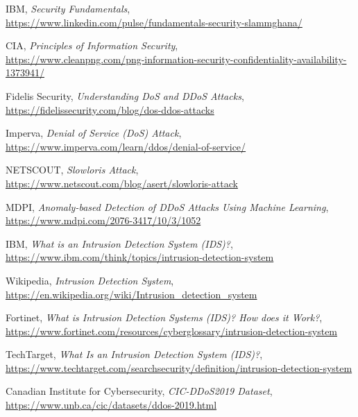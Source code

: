 \documentclass[16pt]{report}
\begin{document}
\begin{thebibliography}{99}

IBM, \emph{Security Fundamentals},\\
\url{https://www.linkedin.com/pulse/fundamentals-security-slammghana/}

CIA, \emph{Principles of Information Security},\\
\url{https://www.cleanpng.com/png-information-security-confidentiality-availability-1373941/}

Fidelis Security, \emph{Understanding DoS and DDoS Attacks},\\
\url{https://fidelissecurity.com/blog/dos-ddos-attacks}

Imperva, \emph{Denial of Service (DoS) Attack},\\
\url{https://www.imperva.com/learn/ddos/denial-of-service/}

NETSCOUT, \emph{Slowloris Attack},\\
\url{https://www.netscout.com/blog/asert/slowloris-attack}

MDPI, \emph{Anomaly-based Detection of DDoS Attacks Using Machine Learning},\\
\url{https://www.mdpi.com/2076-3417/10/3/1052}

IBM, \emph{What is an Intrusion Detection System (IDS)?},\\
\url{https://www.ibm.com/think/topics/intrusion-detection-system}

Wikipedia, \emph{Intrusion Detection System},\\
\url{https://en.wikipedia.org/wiki/Intrusion_detection_system}

Fortinet, \emph{What is Intrusion Detection Systems (IDS)? How does it Work?},\\
\url{https://www.fortinet.com/resources/cyberglossary/intrusion-detection-system}

TechTarget, \emph{What Is an Intrusion Detection System (IDS)?},\\
\url{https://www.techtarget.com/searchsecurity/definition/intrusion-detection-system}

Canadian Institute for Cybersecurity, \emph{CIC-DDoS2019 Dataset},\\
\url{https://www.unb.ca/cic/datasets/ddos-2019.html}

\end{thebibliography}
\end{document}
